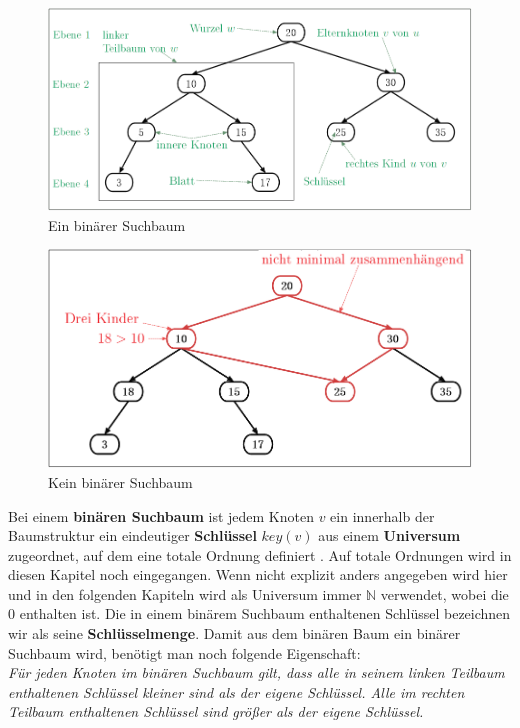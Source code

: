 \documentclass[a4paper,12pt]{article}
\begin{document}
\begin{figure}[h]
	\centering
	\includegraphics[width= 1\textwidth]{"Medien/Einleitung/ioSuchbaum"}
	\caption{Ein binärer Suchbaum }
	\label{fig:ioSuchbaum}
\end{figure}
\begin{figure}[h]
	\centering
	\includegraphics[width= 1\textwidth]{"Medien/Einleitung/nioSuchbaum"}
	\caption{Kein binärer Suchbaum }
	\label{fig:nioSuchbaum}
\end{figure}

\noindent Bei einem \textbf{binären Suchbaum} ist jedem Knoten $v$ ein innerhalb der Baumstruktur ein eindeutiger \textbf{Schlüssel} $\mathit{key}\left(v\right)$ aus einem \textbf{Universum} zugeordnet, auf dem eine totale Ordnung definiert . Auf totale Ordnungen wird in diesen Kapitel noch eingegangen. Wenn nicht explizit anders angegeben wird hier und in den folgenden Kapiteln wird als Universum immer $\mathbb{N}$ verwendet, wobei die $0$ enthalten ist. Die in einem binärem Suchbaum enthaltenen Schlüssel bezeichnen wir als seine \textbf{Schlüsselmenge}.  Damit aus dem binären Baum ein binärer Suchbaum wird, benötigt man noch folgende Eigenschaft:\\
\textit{Für jeden Knoten im binären Suchbaum gilt, dass alle in seinem linken Teilbaum enthaltenen Schlüssel kleiner sind als der eigene Schlüssel. Alle im rechten Teilbaum enthaltenen Schlüssel sind größer als der eigene Schlüssel.} \\
\end{document}
